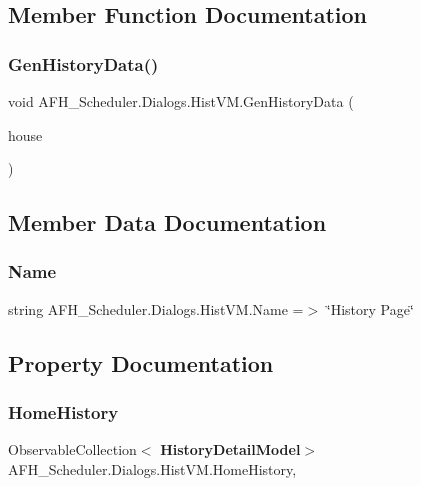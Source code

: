 \subsection{Member Function Documentation}
\mbox{\label{class_a_f_h___scheduler_1_1_dialogs_1_1_hist_v_m_af32eee969b42549447a710084cbf3156}} 
\subsubsection{GenHistoryData()}
{\footnotesize\ttfamily void A\+F\+H\+\_\+\+Scheduler.\+Dialogs.\+Hist\+V\+M.\+Gen\+History\+Data (\begin{DoxyParamCaption}\item[{\textbf{ Home\+Model}}]{house }\end{DoxyParamCaption})}



\subsection{Member Data Documentation}
\mbox{\label{class_a_f_h___scheduler_1_1_dialogs_1_1_hist_v_m_a457bb24d3503d73282eb1d4b03d59c61}} 
\subsubsection{Name}
{\footnotesize\ttfamily string A\+F\+H\+\_\+\+Scheduler.\+Dialogs.\+Hist\+V\+M.\+Name =$>$ \char`\"{}History Page\char`\"{}}



\subsection{Property Documentation}
\mbox{\label{class_a_f_h___scheduler_1_1_dialogs_1_1_hist_v_m_a2471888165b5d6432d1e82e1d6cfb57e}} 
\subsubsection{HomeHistory}
{\footnotesize\ttfamily Observable\+Collection$<$\textbf{ History\+Detail\+Model}$>$ A\+F\+H\+\_\+\+Scheduler.\+Dialogs.\+Hist\+V\+M.\+Home\+History\hspace{0.3cm}{\ttfamily [get]}, {\ttfamily [set]}}

